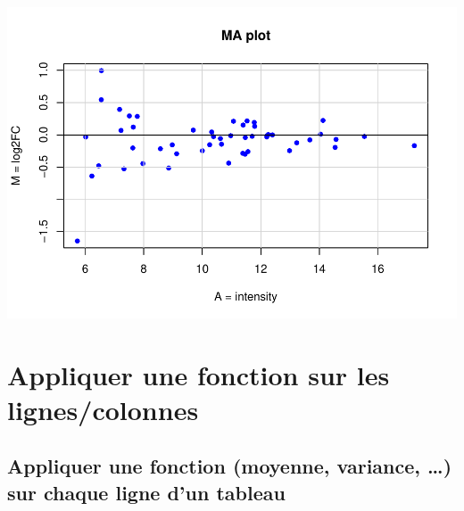 \documentclass[
]{book}
\newenvironment{Shaded}{\begin{snugshade}}{\end{snugshade}}
\newcommand{\AttributeTok}[1]{\textcolor[rgb]{0.77,0.63,0.00}{#1}}
\newcommand{\DecValTok}[1]{\textcolor[rgb]{0.00,0.00,0.81}{#1}}
\newcommand{\FunctionTok}[1]{\textcolor[rgb]{0.00,0.00,0.00}{#1}}
\newcommand{\NormalTok}[1]{#1}
\newcommand{\SpecialCharTok}[1]{\textcolor[rgb]{0.00,0.00,0.00}{#1}}
\newcommand{\StringTok}[1]{\textcolor[rgb]{0.31,0.60,0.02}{#1}}
\begin{document}
\begin{Shaded}
\end{Shaded}

\includegraphics{images/unnamed-chunk-97-1.pdf}

\hypertarget{appliquer-une-fonction-sur-les-lignescolonnes}{%
\section{Appliquer une fonction sur les lignes/colonnes}\label{appliquer-une-fonction-sur-les-lignescolonnes}}

\hypertarget{appliquer-une-fonction-moyenne-variance-sur-chaque-ligne-dun-tableau}{%
\subsection{Appliquer une fonction (moyenne, variance, \ldots) sur chaque ligne d'un tableau}\label{appliquer-une-fonction-moyenne-variance-sur-chaque-ligne-dun-tableau}}
\end{document}

